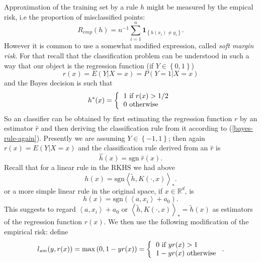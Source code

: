 \documentclass[11pt,twoside]{article}%
\theoremstyle{change}
\begin{document}
Approximation of the training set by a rule $h$ might be measured by the
empical risk, i.e the proportion of misclassified points:
\[
R_{emp}(h)=n^{-1}\sum_{i=1}^{n}\mathbf{1}_{\left\{  h(x_{i})\neq
y_{i}\right\}  }.
\]
However it is common to use a somewhat modified expression, called
\textit{soft margin risk}. For that recall that the classification problem can
be understood in such a way that our object is the regression function (if
$Y\in\left\{  0,1\right\}  $)
\begin{equation}
r(x)=E\left(  Y|X=x\right)  =P\left(  Y=1|X=x\right)
\end{equation}
and the Bayes decision is such that
\begin{equation}
h^{\ast}(x)=\left\{
\begin{tabular}
[c]{l}%
$1$ if $r(x)>1/2$\\
$0$ otherwise
\end{tabular}
\right. \label{bayes-rule-again}%
\end{equation}
So an classifier can be obtained by first estimating the regression function
$r$ by an estimator $\hat{r}$ and then deriving the classification rule from
it according to (\ref{bayes-rule-again}). Presently we are assuming
$Y\in\left\{  -1,1\right\}  $; then again $r(x)=E\left(  Y|X=x\right)  $ and
the classification rule derived from an $\hat{r}$ is
\[
\hat{h}(x)=\mathrm{sgn\;}\hat{r}(x).
\]
Recall that for a linear rule in the RKHS we had above
\begin{equation}
h(x)=\mathrm{sgn}\left\langle \tilde{h},K\left(  \cdot,x\right)  \right\rangle
_{\ast}.\label{lin-rule-rkhs}%
\end{equation}
or a more simple linear rule in the original space, if $x\in\mathbb{R}^{d}$,
is
\begin{equation}
h(x)=\mathrm{sgn}\left(  \left\langle a,x_{i}\right\rangle +a_{0}\right)
.\label{hyppl-rule}%
\end{equation}
This suggests to regard $\left\langle a,x_{i}\right\rangle +a_{0}$ or
$\left\langle \tilde{h},K\left(  \cdot,x\right)  \right\rangle _{\ast}%
=\tilde{h}(x)$ as estimators of the regression function $r(x)$. We then use
the following modification of the empirical risk: define
\begin{equation}
l_{sm}(y,r(x))=\max\left(  0,1-yr(x)\right)  =\left\{
\begin{tabular}
[c]{l}%
$0$ if $yr(x)>1$\\
$1-yr(x)$ otherwise
\end{tabular}
\right.  .\label{soft-margin-loss}%
\end{equation}
\end{document}
